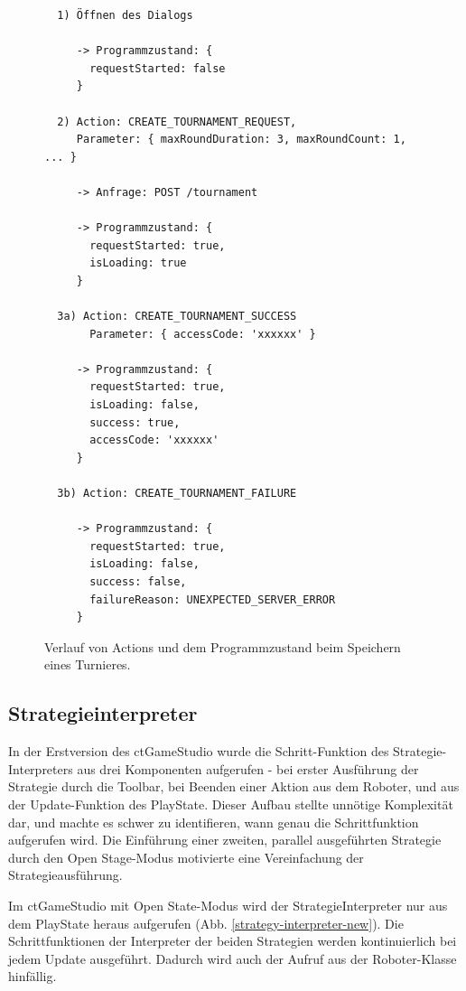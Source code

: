 \begin{figure}
  \begin{lstlisting}
  1) Öffnen des Dialogs

     -> Programmzustand: {
       requestStarted: false
     }

  2) Action: CREATE_TOURNAMENT_REQUEST,
     Parameter: { maxRoundDuration: 3, maxRoundCount: 1, ... }

     -> Anfrage: POST /tournament

     -> Programmzustand: {
       requestStarted: true,
       isLoading: true
     }

  3a) Action: CREATE_TOURNAMENT_SUCCESS
       Parameter: { accessCode: 'xxxxxx' }

     -> Programmzustand: {
       requestStarted: true,
       isLoading: false,
       success: true,
       accessCode: 'xxxxxx'
     }

  3b) Action: CREATE_TOURNAMENT_FAILURE

     -> Programmzustand: {
       requestStarted: true,
       isLoading: false,
       success: false,
       failureReason: UNEXPECTED_SERVER_ERROR
     }
  \end{lstlisting}

  \caption{Verlauf von Actions und dem Programmzustand beim Speichern eines Turnieres.}

  \label{create-tournament-flow}
\end{figure}


\subsection{Strategieinterpreter}

In der Erstversion des ctGameStudio wurde die Schritt-Funktion des Strategie-Interpreters aus drei Komponenten
aufgerufen - bei erster Ausführung der Strategie durch die Toolbar, bei Beenden einer Aktion aus dem
Roboter, und aus der Update-Funktion des PlayState. Dieser Aufbau stellte unnötige Komplexität dar,
und machte es schwer zu identifieren, wann genau die Schrittfunktion aufgerufen wird. Die Einführung
einer zweiten, parallel ausgeführten Strategie durch den Open Stage-Modus motivierte eine
Vereinfachung der Strategieausführung.

Im ctGameStudio mit Open State-Modus wird der StrategieInterpreter nur aus dem PlayState heraus
aufgerufen (Abb. \ref{strategy-interpreter-new}). Die Schrittfunktionen der Interpreter der beiden
Strategien werden kontinuierlich bei jedem Update ausgeführt. Dadurch wird auch der Aufruf aus der
Roboter-Klasse hinfällig.

